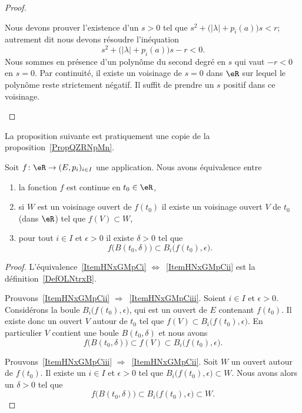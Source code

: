\begin{proof}
\begin{subproof}
		Nous devons prouver l'existence d'un \( s>0\) tel que \( s^2+\big( | \lambda |+p_i(a) \big)s < r\); autrement dit nous devons résoudre l'inéquation
		\begin{equation}
			s^2+\big( | \lambda |+p_i(a) \big)s-r< 0.
		\end{equation}
		Nous sommes en présence d'un polynôme du second degré en \( s\) qui vaut \( -r<0\) en \( s=0\). Par continuité, il existe un voisinage de \( s=0\) dans \( \eR\) sur lequel le polynôme reste strictement négatif. Il suffit de prendre un \( s\) positif dans ce voisinage.
	\end{subproof}
\end{proof}


La proposition suivante est pratiquement une copie de la proposition~\ref{PropQZRNpMn}.
\begin{proposition} \label{PropNGjQnqF}
	Soit \( f\colon \eR\to (E,p_i)_{i\in I}\) une application. Nous avons équivalence entre
	\begin{enumerate}
		\item   \label{ItemHNxGMpCi}
		      la fonction \( f\) est continue en \( t_0\in \eR\),
		      \item\label{ItemHNxGMpCii}
		      si \( W\) est un voisinage ouvert de \( f(t_0)\) il existe un voisinage ouvert \( V\) de \( t_0\) (dans \( \eR\)) tel que \( f(V)\subset W\),
		      \item\label{ItemHNxGMpCiii}
		      pour tout \( i\in I\) et \( \epsilon>0\) il existe \( \delta>0\) tel que
		      \begin{equation}
			      f\big( B(t_0,\delta) \big)\subset B_i\big( f(t_0),\epsilon \big).
		      \end{equation}
	\end{enumerate}
\end{proposition}

\begin{proof}
	L'équivalence~\ref{ItemHNxGMpCi} \( \Leftrightarrow\)~\ref{ItemHNxGMpCii} est la définition~\ref{DefOLNtrxB}.

	Prouvons~\ref{ItemHNxGMpCii} \( \Rightarrow\)~\ref{ItemHNxGMpCiii}. Soient \( i\in I\) et \( \epsilon>0\). Considérons la boule \( B_i\big( f(t_0),\epsilon \big)\), qui est un ouvert de \( E\) contenant \( f(t_0)\). Il existe donc un ouvert \( V\) autour de \( t_0\) tel que \( f(V)\subset B_i\big( f(t_0),\epsilon \big)\). En particulier \( V\) contient une boule \( B(t_0,\delta)\) et nous avons
	\begin{equation}
		f\big( B(t_0,\delta) \big)\subset f(V)\subset B_i\big( f(t_0),\epsilon \big).
	\end{equation}

	Prouvons~\ref{ItemHNxGMpCiii} \( \Rightarrow\)~\ref{ItemHNxGMpCii}. Soit \( W\) un ouvert autour de \( f(t_0)\). Il existe un \( i\in I\) et \( \epsilon>0\) tel que \( B_i\big( f(t_0),\epsilon \big)\subset W\). Nous avons alors un \( \delta>0\) tel que
	\begin{equation}
		f\big( B(t_0,\delta) \big)\subset B_i\big( f(t_0),\epsilon \big)\subset W.
	\end{equation}
\end{proof}

